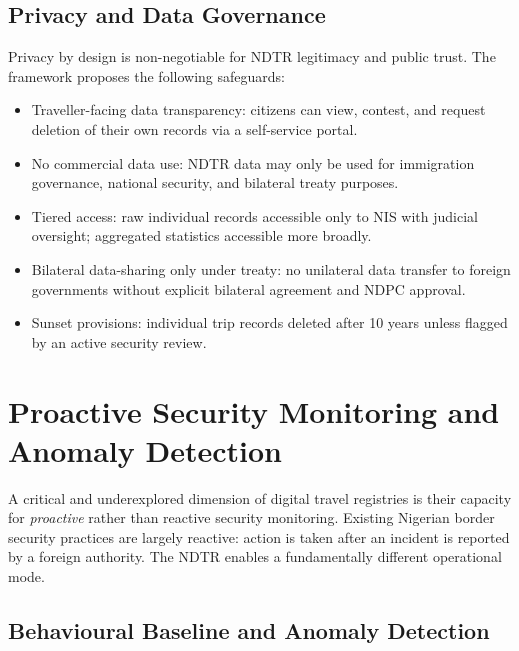 \documentclass[11pt]{article}
\begin{document}
\subsection{Privacy and Data Governance}

Privacy by design is non-negotiable for NDTR legitimacy and public
trust. The framework proposes the following safeguards:

\begin{itemize}
  \item Traveller-facing data transparency: citizens can view, contest,
  and request deletion of their own records via a self-service portal.

  \item No commercial data use: NDTR data may only be used for
  immigration governance, national security, and bilateral treaty purposes.

  \item Tiered access: raw individual records accessible only to NIS
  with judicial oversight; aggregated statistics accessible more broadly.

  \item Bilateral data-sharing only under treaty: no unilateral data
  transfer to foreign governments without explicit bilateral agreement
  and NDPC approval.

  \item Sunset provisions: individual trip records deleted after
  10 years unless flagged by an active security review.
\end{itemize}

\section{Proactive Security Monitoring and Anomaly Detection}
\label{sec:security}

A critical and underexplored dimension of digital travel registries
is their capacity for \textit{proactive} rather than reactive security
monitoring. Existing Nigerian border security practices are largely
reactive: action is taken after an incident is reported by a foreign
authority. The NDTR enables a fundamentally different operational mode.

\subsection{Behavioural Baseline and Anomaly Detection}
\end{document}
